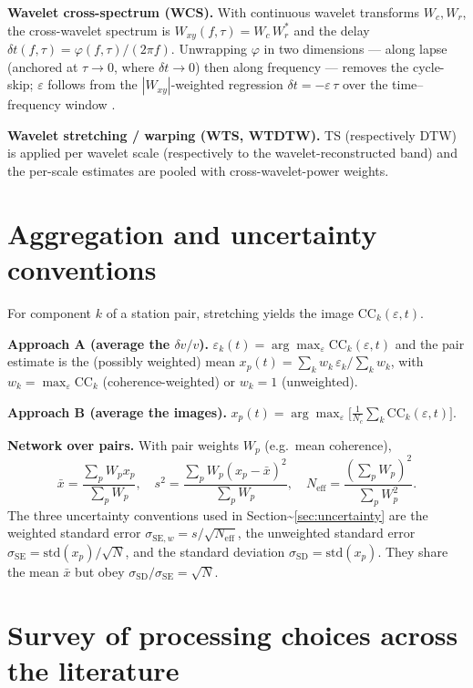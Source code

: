 \documentclass[
  11pt,
  letterpaper,
]{article}
\providecommand{\dvv}{\ensuremath{\delta v/v}}
\begin{document}
\textbf{Wavelet cross-spectrum (WCS).} With continuous wavelet
transforms \(W_c,W_r\), the cross-wavelet spectrum is
\(W_{xy}(f,\tau)=W_c\,W_r^{*}\) and the delay \(\delta
t(f,\tau)=\varphi(f,\tau)/(2\pi f)\). Unwrapping \(\varphi\) in two
dimensions --- along lapse (anchored at \(\tau\!\to\!0\), where
\(\delta t\!\to\!0\)) then along frequency --- removes the cycle-skip;
\(\varepsilon\) follows from the \(|W_{xy}|\)-weighted regression
\(\delta t=-\varepsilon\,\tau\) over the time--frequency window
\citep{Mao2020}.

\textbf{Wavelet stretching / warping (WTS, WTDTW).} TS (respectively
DTW) is applied per wavelet scale (respectively to the
wavelet-reconstructed band) and the per-scale estimates are pooled with
cross-wavelet-power weights.

\section{Aggregation and uncertainty conventions}\label{app:aggregation}

For component \(k\) of a station pair, stretching yields the image
\(\mathrm{CC}_k(\varepsilon,t)\).

\textbf{Approach A (average the \dvv).}
\(\varepsilon_k(t)=\arg\max_{\varepsilon} \mathrm{CC}_k(\varepsilon,t)\)
and the pair estimate is the (possibly weighted) mean
\(x_p(t)=\sum_k w_k\,\varepsilon_k/\sum_k
w_k\), with \(w_k=\max_{\varepsilon} \mathrm{CC}_k\)
(coherence-weighted) or \(w_k=1\) (unweighted).

\textbf{Approach B (average the images).}
\(x_p(t)=\arg\max_{\varepsilon}\big[\tfrac1{N_c}\sum_k \mathrm{CC}_k(\varepsilon,t)\big]\).

\textbf{Network over pairs.} With pair weights \(W_p\) (e.g.~mean
coherence), \begin{equation}
\bar x=\frac{\sum_p W_p x_p}{\sum_p W_p},\quad
s^2=\frac{\sum_p W_p (x_p-\bar x)^2}{\sum_p W_p},\quad
N_{\mathrm{eff}}=\frac{(\sum_p W_p)^2}{\sum_p W_p^2}.
\end{equation} The three uncertainty conventions used in
Section\textasciitilde{}\ref{sec:uncertainty} are the weighted standard
error \(\sigma_{\mathrm{SE},w}=s/\sqrt{N_{\mathrm{eff}}}\), the
unweighted standard error
\(\sigma_{\mathrm{SE}}=\mathrm{std}(x_p)/\sqrt{N}\), and the standard
deviation \(\sigma_{\mathrm{SD}}=\mathrm{std}(x_p)\). They share the
mean \(\bar x\) but obey
\(\sigma_{\mathrm{SD}}/\sigma_{\mathrm{SE}}=\sqrt{N}\).

\section{Survey of processing choices across the
literature}\label{app:survey}
\end{document}
